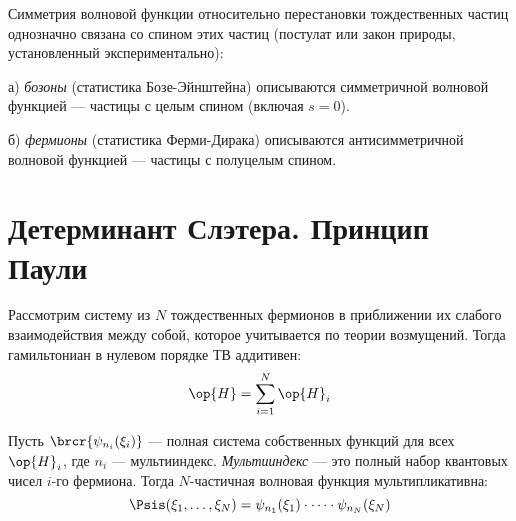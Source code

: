 Симметрия волновой функции относительно перестановки тождественных частиц однозначно связана со спином этих частиц (постулат или закон природы, установленный экспериментально):

а) {\em бозоны} (статистика Бозе-Эйнштейна\footnotemark) описываются симметричной волновой функцией --- частицы с целым спином (включая $s = 0$).

б) {\em фермионы} (статистика Ферми-Дирака) описываются антисимметричной волновой функцией --- частицы с полуцелым спином.

\section{Детерминант Слэтера. Принцип Паули}

Рассмотрим систему из $N$ тождественных фермионов в приближении их слабого взаимодействия между собой, которое учитывается по теории возмущений. Тогда гамильтониан в нулевом порядке ТВ аддитивен:
$$
\op{H} = \sum_{i=1}^N\op{H}_i
$$

Пусть $\brcr{\psi_{n_i}(\xi_i)}$ --- полная система собственных функций для всех $\op{H}_i$, где $n_i$ --- мультииндекс. {\em Мультииндекс} --- это полный набор квантовых чисел $i$-го фермиона. Тогда $N$-частичная волновая функция мультипликативна:
\begin{equation}
\label{eq:16_2_1}
\Psis(\xi_1, \dots, \xi_N) = \psi_{n_1}(\xi_1) \cdot \dots \cdot \psi_{n_N}(\xi_N)
\end{equation}

